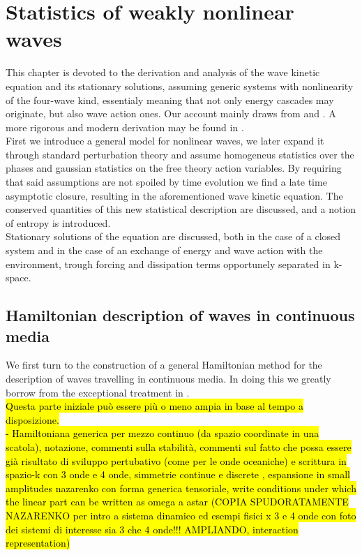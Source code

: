 \newpage
\phantom{}
\section{Statistics of weakly nonlinear waves}

This chapter is devoted to the derivation and analysis of the wave kinetic equation and its stationary solutions, assuming generic systems with nonlinearity of 
the four-wave kind, essentialy meaning that not only energy cascades may originate, but also wave action ones. Our account mainly draws from \cite{Onorato2020} and 
\cite{Zakharov}. A more rigorous and modern derivation may be found in \cite{Nazarenko2011}. \\
First we introduce a general model for nonlinear waves, we later expand it through standard perturbation theory and assume homogeneus statistics over the phases 
and gaussian statistics on the free theory action variables. By requiring that said assumptions are not spoiled by time evolution we find a late time asymptotic closure, 
resulting in the aforementioned wave kinetic equation. The conserved quantities of this new statistical description are discussed, and a notion of entropy is introduced. \\
Stationary solutions of the equation are discussed, both in the case of a closed system and  in the case of an exchange of energy 
and wave action with the environment, trough forcing and dissipation terms opportunely separated in k-space.\\ 

\subsection{Hamiltonian description of waves in continuous media}

We first turn to the construction of a general Hamiltonian method for the description of waves travelling in continuous media. In doing this
we greatly borrow from the exceptional treatment in \cite{Zakharov}. \\
\hl{Questa parte iniziale può essere più o meno ampia in base al tempo a disposizione. \\
- Hamiltoniana generica per mezzo continuo (da spazio coordinate in una scatola), notazione, commenti sulla stabilità, commenti sul fatto che possa essere
già risultato di sviluppo pertubativo (come per le onde oceaniche) e scrittura in spazio-k con 3 onde e 4 onde, 
simmetrie continue e discrete , espansione in small amplitudes nazarenko con forma generica tensoriale, write conditions under which the linear part 
can be written as omega a astar (COPIA SPUDORATAMENTE NAZARENKO per intro a sistema dinamico ed esempi fisici x 3 e 4 onde con foto dei sistemi di interesse 
sia 3 che 4 onde!!! AMPLIANDO, interaction representation)}\\

